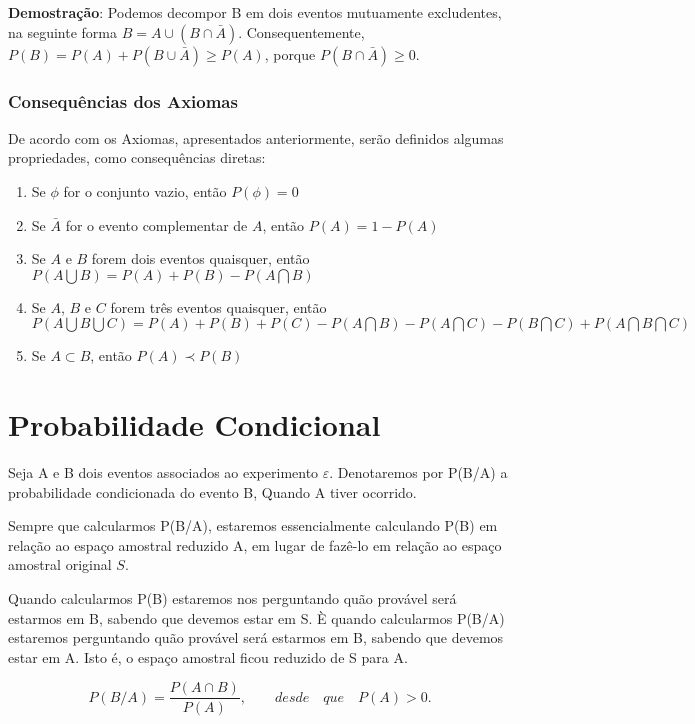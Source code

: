 \textbf{Demostração}: Podemos decompor B em dois eventos
mutuamente excludentes, na seguinte forma $B = A \cup (B \cap
\bar{A})$. Consequentemente, $P(B) = P(A)+ P(B \cup \bar{A}) \geq
P(A)$, porque $P(B \cap \bar{A}) \geq 0$.


\subsubsection{Consequências dos Axiomas}

\inic De acordo com os Axiomas, apresentados anteriormente, serão definidos algumas propriedades, como consequências diretas:

\begin{enumerate}
\item Se $\phi$ for o conjunto vazio, então $P(\phi)=0$
\item Se $\bar{A}$ for o evento complementar de $A$, então $P(A)=1-P(A)$
\item Se $A$ e $B$ forem dois eventos quaisquer, então $P(A \bigcup B)= P(A)+P(B)-P(A \bigcap B)$ 
\item Se $A$, $B$ e $C$ forem três eventos quaisquer, então $P(A \bigcup B \bigcup C)= P(A)+P(B)+P(C)- P(A \bigcap B)- P(A \bigcap C)- P(B \bigcap C)+P(A \bigcap B \bigcap C)$
\item Se $A \subset B$, então $P(A) \prec P(B)$
\end{enumerate}



\newpage
\section{Probabilidade Condicional}

Seja A e B dois eventos associados ao experimento $\varepsilon$.
Denotaremos por P(B/A) a probabilidade condicionada do evento B,
Quando A tiver ocorrido.\vskip0.3cm

Sempre que calcularmos P(B/A), estaremos essencialmente calculando
P(B) em relação ao espaço amostral reduzido A, em lugar de fazê-lo
em relação ao espaço amostral original $S$.\vskip0.3cm

Quando calcularmos P(B) estaremos nos perguntando quão provável
será estarmos em B, sabendo que devemos estar em S. È quando
calcularmos P(B/A) estaremos perguntando quão provável será
estarmos em B, sabendo que devemos estar em A. Isto é, o espaço
amostral ficou reduzido de S para A.



\begin{equation}\label{}
    P(B/A) = \frac{P(A \cap B)}{P(A)}, \quad \quad desde \quad que
    \quad P(A)>0.
\end{equation}

